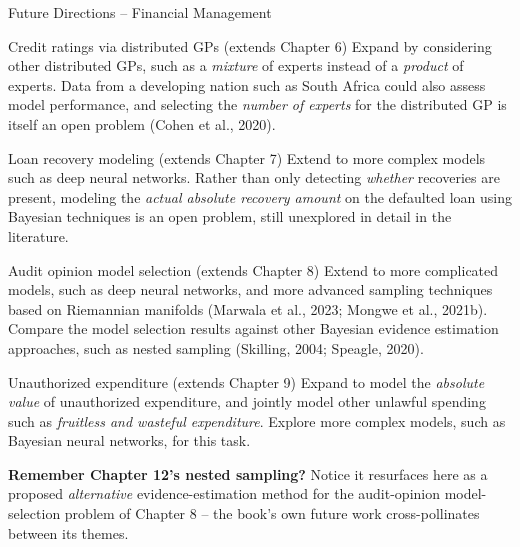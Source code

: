 \documentclass[aspectratio=169,10pt]{beamer}
\begin{document}
\begin{frame}[allowframebreaks]{Future Directions -- Financial Management}
  \begin{block}{Credit ratings via distributed GPs (extends Chapter 6)}
    Expand by considering other distributed GPs, such as a
    \emph{mixture} of experts instead of a \emph{product} of experts.
    Data from a developing nation such as South Africa could also assess
    model performance, and selecting the \emph{number of experts} for the
    distributed GP is itself an open problem (Cohen et al., 2020).
  \end{block}
  \begin{block}{Loan recovery modeling (extends Chapter 7)}
    Extend to more complex models such as deep neural networks. Rather
    than only detecting \emph{whether} recoveries are present, modeling
    the \emph{actual absolute recovery amount} on the defaulted loan
    using Bayesian techniques is an open problem, still unexplored in
    detail in the literature.
  \end{block}

  \framebreak

  \begin{block}{Audit opinion model selection (extends Chapter 8)}
    Extend to more complicated models, such as deep neural networks, and
    more advanced sampling techniques based on Riemannian manifolds
    (Marwala et al., 2023; Mongwe et al., 2021b). Compare the model
    selection results against other Bayesian evidence estimation
    approaches, such as nested sampling (Skilling, 2004; Speagle, 2020).
  \end{block}
  \begin{block}{Unauthorized expenditure (extends Chapter 9)}
    Expand to model the \emph{absolute value} of unauthorized
    expenditure, and jointly model other unlawful spending such as
    \emph{fruitless and wasteful expenditure}. Explore more complex
    models, such as Bayesian neural networks, for this task.
  \end{block}

  \textbf{Remember Chapter 12's nested sampling?} Notice it resurfaces
  here as a proposed \emph{alternative} evidence-estimation method for
  the audit-opinion model-selection problem of Chapter 8 -- the book's
  own future work cross-pollinates between its themes.
\end{frame}
\end{document}
